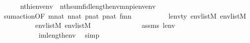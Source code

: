 \begin{isabellebody}
\ \ \ \ \isamarkupfalse%
\ {\isachardoublequoteopen}nth{\isacharparenleft}{\kern0pt}i{\isacharcomma}{\kern0pt}env{\isacharat}{\kern0pt}env{}{\isacharparenright}{\kern0pt}\ {\isacharequal}{\kern0pt}\ nth{\isacharparenleft}{\kern0pt}sum{\isacharparenleft}{\kern0pt}f{\isacharcomma}{\kern0pt}id{\isacharparenleft}{\kern0pt}length{\isacharparenleft}{\kern0pt}env{}{\isacharparenright}{\kern0pt}{\isacharparenright}{\kern0pt}{\isacharcomma}{\kern0pt}{\isacharquery}{\kern0pt}m{\isacharcomma}{\kern0pt}{\isacharquery}{\kern0pt}n{\isacharcomma}{\kern0pt}{\isacharquery}{\kern0pt}p{\isacharparenright}{\kern0pt}{\isacharbackquote}{\kern0pt}i{\isacharcomma}{\kern0pt}env{\isacharprime}{\kern0pt}{\isacharat}{\kern0pt}env{}{\isacharparenright}{\kern0pt}{\isachardoublequoteclose}\isanewline
\ \ \ \ \ \ \isamarkupfalse%
\ sum{\isacharunderscore}{\kern0pt}action{\isacharbrackleft}{\kern0pt}OF\ {\isacartoucheopen}{\isacharquery}{\kern0pt}m{\isasymin}nat{\isacartoucheclose}\ {\isacartoucheopen}{\isacharquery}{\kern0pt}n{\isasymin}nat{\isacartoucheclose}\ {\isacartoucheopen}{\isacharquery}{\kern0pt}p{\isasymin}nat{\isacartoucheclose}\ {\isacartoucheopen}{\isacharquery}{\kern0pt}p{\isasymin}nat{\isacartoucheclose}\ {\isacartoucheopen}f{\isasymin}{\isacharquery}{\kern0pt}m{\isasymrightarrow}{\isacharquery}{\kern0pt}n{\isacartoucheclose}\isanewline
\ \ \ \ \ \ \ \ \ \ lenv{\isacharunderscore}{\kern0pt}ty\ {\isacartoucheopen}env{\isasymin}list{\isacharparenleft}{\kern0pt}M{\isacharparenright}{\kern0pt}{\isacartoucheclose}\ {\isacartoucheopen}env{\isacharprime}{\kern0pt}{\isasymin}list{\isacharparenleft}{\kern0pt}M{\isacharparenright}{\kern0pt}{\isacartoucheclose}\isanewline
\ \ \ \ \ \ \ \ \ \ {\isacartoucheopen}env{}{\isasymin}list{\isacharparenleft}{\kern0pt}M{\isacharparenright}{\kern0pt}{\isacartoucheclose}\ {\isacartoucheopen}env{}{\isasymin}list{\isacharparenleft}{\kern0pt}M{\isacharparenright}{\kern0pt}{\isacartoucheclose}\ {\isacharunderscore}{\kern0pt}\isanewline
\ \ \ \ \ \ \ \ \ \ {\isacharunderscore}{\kern0pt}\ {\isacharunderscore}{\kern0pt}\ \ assms{\isacharparenleft}{\kern0pt}{}{\isacharparenright}{\kern0pt}\ lenv\isanewline
\ \ \ \ \ \ \ \ \ \ {\isacharbrackright}{\kern0pt}\ {\isacartoucheopen}i{\isacharless}{\kern0pt}{\isacharquery}{\kern0pt}m{\isacharhash}{\kern0pt}{\isacharplus}{\kern0pt}length{\isacharparenleft}{\kern0pt}env{}{\isacharparenright}{\kern0pt}{\isacartoucheclose}\ \isamarkupfalse%
\ simp\isanewline
\ \ \isacommand{{\isacharbraceright}{\kern0pt}}\isamarkupfalse%

\end{isabellebody}
